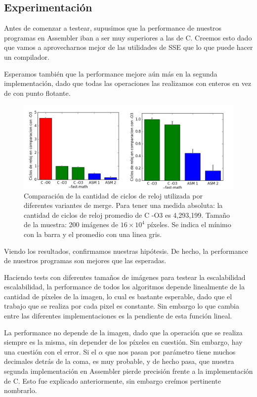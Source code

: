 \pagebreak

\subsection{Experimentación}

Antes de comenzar a testear, supusimos que la performance de nuestros programas en Assembler iban a ser muy superiores a las de C. Creemos esto dado que vamos a aprovecharnos mejor de las utilidades de SSE que lo que puede hacer un compilador. 

Esperamos también que la performance mejore aún más en la segunda implementación, dado que todas las operaciones las realizamos con enteros en vez de con punto flotante.


\begin{figure}[!hbt] 
  \centering
  \includegraphics[scale=0.7]{merge-all.png}
  \caption{Comparación de la cantidad de ciclos de reloj utilizada por diferentes variantes de merge. Para tener una medida absoluta: la cantidad de ciclos de reloj promedio de C -O3 es 4,293,199. Tamaño de la muestra: 200 imágenes de $16 \times 10^4$ píxeles. Se indica el mínimo con la barra y el promedio con una linea gris.}
\end{figure}


Viendo los resultados, confirmamos nuestras hipótesis. De hecho, la performance de nuestros programas son mejores que las esperadas.

Haciendo tests con diferentes tamaños de imágenes para testear la escalabilidad escalabilidad, la performance de todos los algoritmos depende linealmente de la cantidad de píxeles de la imagen, lo cual es bastante esperable, dado que el trabajo que se realiza por cada pixel es constante. Sin embargo lo que cambia entre las diferentes implementaciones es la pendiente de esta función lineal.

La performance no depende de la imagen, dado que la operación que se realiza siempre es la misma, sin depender de los píxeles en cuestión.
Sin embargo, hay una cuestión con el error. Si el $\alpha$ que nos pasan por parámetro tiene muchos decimales detrás de la coma, es muy probable, y de hecho pasa, que nuestra segunda implementación en Assembler pierde precisión frente a la implementación de C. Esto fue explicado anteriormente, sin embargo creímos pertinente nombrarlo.

